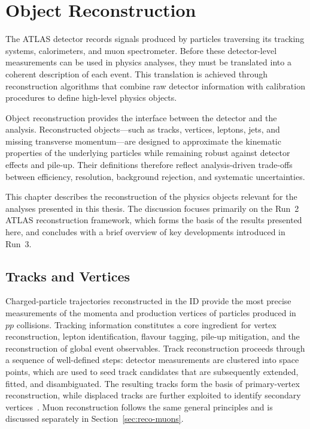 ﻿%

\chapter{Object Reconstruction}
\label{chap:reco}

The ATLAS detector records signals produced by particles traversing its tracking
systems, calorimeters, and muon spectrometer.
Before these detector-level measurements can be used in physics analyses, they
must be translated into a coherent description of each event.
This translation is achieved through reconstruction algorithms that combine raw
detector information with calibration procedures to define high-level physics
objects.

Object reconstruction provides the interface between the detector and the
analysis.
Reconstructed objects—such as tracks, vertices, leptons, jets, and missing
transverse momentum—are designed to approximate the kinematic properties of the
underlying particles while remaining robust against detector effects and
pile-up.
Their definitions therefore reflect analysis-driven trade-offs between
efficiency, resolution, background rejection, and systematic uncertainties.

This chapter describes the reconstruction of the physics objects relevant for the
analyses presented in this thesis.
The discussion focuses primarily on the Run~2 ATLAS reconstruction framework,
which forms the basis of the results presented here, and concludes with a brief
overview of key developments introduced in Run~3.

\section{Tracks and Vertices}

Charged-particle trajectories reconstructed in the ID provide the most precise
measurements of the momenta and production vertices of particles produced in
$pp$ collisions.
Tracking information constitutes a core ingredient for vertex reconstruction,
lepton identification, flavour tagging, pile-up mitigation, and the reconstruction
of global event observables.
Track reconstruction proceeds through a sequence of well-defined steps:
detector measurements are clustered into space points, which are used to seed
track candidates that are subsequently extended, fitted, and disambiguated.
The resulting tracks form the basis of primary-vertex reconstruction, while
displaced tracks are further exploited to identify secondary vertices~\cite{ATLASTrackingDense2017}.
Muon reconstruction follows the same general principles and is discussed
separately in Section~\ref{sec:reco-muons}.


